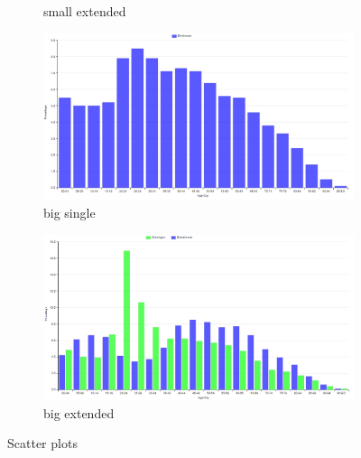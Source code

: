 \documentclass[a4paper,twoside,11pt]{article}
\begin{document}
\begin{figure}
\begin{subfigure}[b]{0.23\textwidth}
                \caption{small extended}
                \label{fig:smallExtended}
        \end{subfigure}
        \begin{subfigure}[b]{0.23\textwidth}
                \includegraphics[width=\textwidth]{Visualization/BarChartExtendedSingle.png}
                \caption{big single}
                \label{fig:bigSingle}
        \end{subfigure}
        \begin{subfigure}[b]{0.23\textwidth}
                \includegraphics[width=\textwidth]{Visualization/BarChartExtendedFull.png}
                \caption{big extended}
                \label{fig:bigExtended}
        \end{subfigure}
        \caption{Scatter plots}\label{fig:BarCharts}
\end{figure}
\newline
\newline
\newline
\newline
\newline
\newline
\newline
\end{document}
